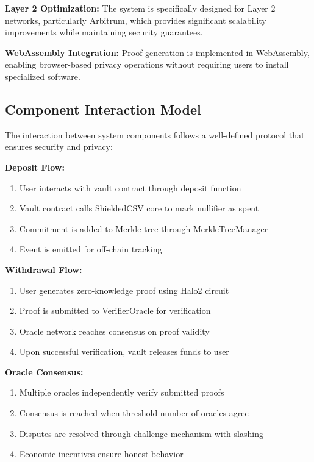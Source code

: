 \documentclass[11pt,a4paper]{article}
\begin{document}
\textbf{Layer 2 Optimization:} The system is specifically designed for Layer 2 networks, particularly Arbitrum, which provides significant scalability improvements while maintaining security guarantees.

\textbf{WebAssembly Integration:} Proof generation is implemented in WebAssembly, enabling browser-based privacy operations without requiring users to install specialized software.

\subsection{Component Interaction Model}

The interaction between system components follows a well-defined protocol that ensures security and privacy:

\textbf{Deposit Flow:}
\begin{enumerate}
    \item User interacts with vault contract through deposit function
    \item Vault contract calls ShieldedCSV core to mark nullifier as spent
    \item Commitment is added to Merkle tree through MerkleTreeManager
    \item Event is emitted for off-chain tracking
\end{enumerate}

\textbf{Withdrawal Flow:}
\begin{enumerate}
    \item User generates zero-knowledge proof using Halo2 circuit
    \item Proof is submitted to VerifierOracle for verification
    \item Oracle network reaches consensus on proof validity
    \item Upon successful verification, vault releases funds to user
\end{enumerate}

\textbf{Oracle Consensus:}
\begin{enumerate}
    \item Multiple oracles independently verify submitted proofs
    \item Consensus is reached when threshold number of oracles agree
    \item Disputes are resolved through challenge mechanism with slashing
    \item Economic incentives ensure honest behavior
\end{enumerate}
\end{document}
